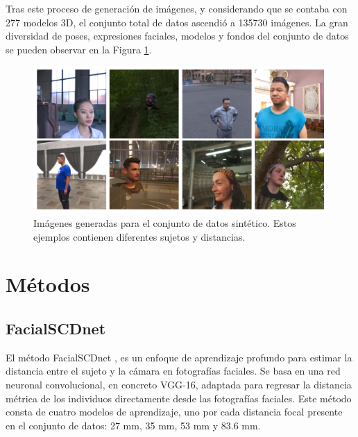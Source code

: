 Tras este proceso de generación de imágenes, y considerando que se contaba con 277 modelos 3D, el conjunto total de datos ascendió a 135730 imágenes. La gran diversidad de poses, expresiones faciales, modelos y fondos del conjunto de datos se pueden observar en la Figura \ref{fig24}.


\begin{figure}[h]
	\centering
	\includegraphics[scale=0.4]{imagenes/cap4/ejemplos_dataset.png}
	\caption[Ejemplos de imágenes generadas para el conjunto de datos.]{Imágenes generadas para el conjunto de datos sintético. Estos ejemplos contienen diferentes sujetos y distancias.}
	\label{fig24}
\end{figure}

\section{Métodos}

\subsection{FacialSCDnet}\label{fscdnet}

El método FacialSCDnet \cite{14}, es un enfoque de aprendizaje profundo para estimar la distancia entre el sujeto y la cámara en fotografías faciales. Se basa en una red neuronal convolucional, en concreto VGG-16, adaptada para regresar la distancia métrica de los individuos directamente desde las fotografías faciales. Este método consta de cuatro modelos de aprendizaje, uno por cada distancia focal presente en el conjunto de datos: 27 mm, 35 mm, 53 mm y 83.6 mm.
\newline 

